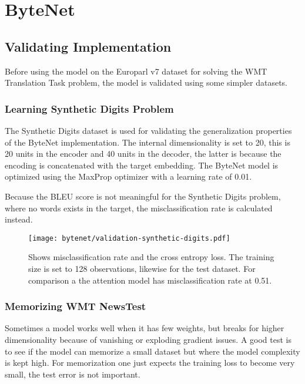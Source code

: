 
\section{ByteNet}

\subsection{Validating Implementation}

Before using the model on the Europarl v7 dataset for solving the WMT Translation Task problem, the model is validated using some simpler datasets.

\subsubsection{Learning Synthetic Digits Problem}

The Synthetic Digits dataset is used for validating the generalization properties of the ByteNet implementation. The internal dimensionality is set to 20, this is 20 units in the encoder and 40 units in the decoder, the latter is because the encoding is concatenated with the target embedding. The ByteNet model is optimized using the MaxProp optimizer with a learning rate of 0.01.

Because the BLEU score is not meaningful for the Synthetic Digits problem, where no words exists in the target, the misclassification rate is calculated instead.

\begin{figure}[H]
    \centering
    \texttt{[image: bytenet/validation-synthetic-digits.pdf]}
    \caption{Shows misclassification rate and the cross entropy loss. The training size is set to 128 observations, likewise for the test dataset. For comparison a the attention model has misclassification rate at 0.51.}
\end{figure}



\clearpage
\subsubsection{Memorizing WMT NewsTest}

Sometimes a model works well when it has few weights, but breaks for higher dimensionality because of vanishing or exploding gradient issues. A good test is to see if the model can memorize a small dataset but where the model complexity is kept high. For memorization one just expects the training loss to become very small, the test error is not important.


